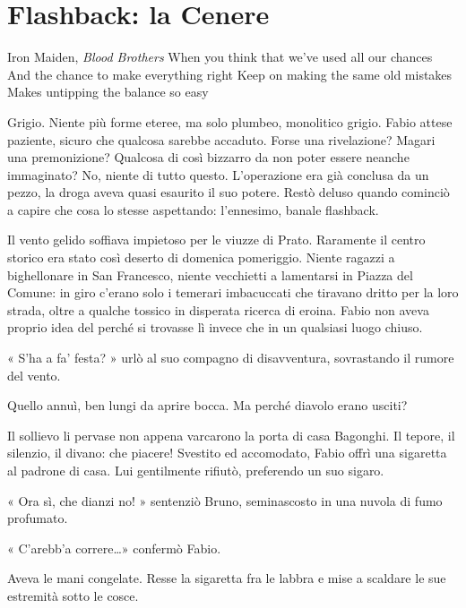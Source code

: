 \chapter{Flashback: la Cenere}

\begin{chapquote}{Iron Maiden, \textit{Blood Brothers}}
	When you think that we've used all our chances\newline
	And the chance to make everything right\newline
	Keep on making the same old mistakes\newline
	Makes untipping the balance so easy
\end{chapquote}


Grigio. Niente più forme eteree, ma solo plumbeo, monolitico grigio. Fabio attese paziente, sicuro che qualcosa sarebbe accaduto. Forse una rivelazione? Magari una premonizione? Qualcosa di così bizzarro da non poter essere neanche immaginato? No, niente di tutto questo. L'operazione era già conclusa da un pezzo, la droga aveva quasi esaurito il suo potere. Restò deluso quando cominciò a capire che cosa lo stesse aspettando: l'ennesimo, banale flashback.

Il vento gelido soffiava impietoso per le viuzze di Prato. Raramente il centro storico era stato così deserto di domenica pomeriggio. Niente ragazzi a bighellonare in San Francesco, niente vecchietti a lamentarsi in Piazza del Comune: in giro c'erano solo i temerari imbacuccati che tiravano dritto per la loro strada, oltre a qualche tossico in disperata ricerca di eroina. Fabio non aveva proprio idea del perché si trovasse lì invece che in un qualsiasi luogo chiuso.

« S'ha a fa' festa? » urlò al suo compagno di disavventura, sovrastando il rumore del vento.

Quello annuì, ben lungi da aprire bocca. Ma perché diavolo erano usciti?

Il sollievo li pervase non appena varcarono la porta di casa Bagonghi. Il tepore, il silenzio, il divano: che piacere! Svestito ed accomodato, Fabio offrì una sigaretta al padrone di casa. Lui gentilmente rifiutò, preferendo un suo sigaro.

« Ora sì, che dianzi no! » sentenziò Bruno, seminascosto in una nuvola di fumo profumato.

« C'arebb'a correre\ldots» confermò Fabio.

Aveva le mani congelate. Resse la sigaretta fra le labbra e mise a scaldare le sue estremità sotto le cosce.

